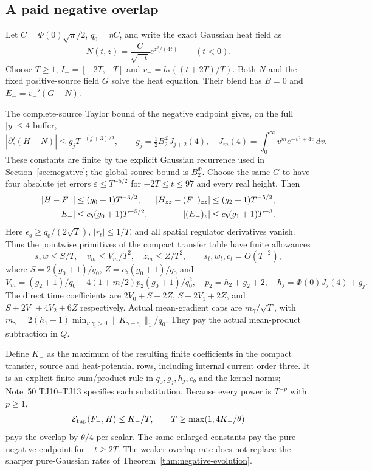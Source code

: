 \subsection{A paid negative overlap}
Let $C=\Phi(0)\sqrt\pi/2$, $q_0=\eta C$, and write the exact
Gaussian heat field as
\begin{equation}
 N(t,z)=\frac C{\sqrt{-t}}e^{z^2/(4t)}\qquad(t<0).
 \label{eq:tc-negative-model}
\end{equation}
Choose $T\ge1$, $I_-=[-2T,-T]$ and
$v_-=b_*((t+2T)/T)$. Both $N$ and the fixed positive-source field
$G$ solve the heat equation. Their blend has $B=0$ and
$E_-=v_-'(G-N)$.

The complete-source Taylor bound of the negative endpoint gives, on
the full $|y|\le4$ buffer,
\[
 |\partial_z^j(H-N)|\le g_jT^{-(j+3)/2},\qquad
 g_j=\tfrac12 B_2^\Phi J_{j+2}(4),\quad
 J_m(4)=\int_0^\infty v^m e^{-v^2+4v}\,dv.
\]
These constants are finite by the explicit Gaussian recurrence used in
Section~\ref{sec:negative}; the global source bound is $B_2^\Phi$.
Choose the same $G$ to have four absolute jet errors
$\varepsilon\le T^{-5/2}$ for $-2T\le t\le97$ and every real height.
Then
\begin{align}
 |H-F_-|&\le(g_0+1)T^{-3/2},&
 |H_{zz}-(F_-)_{zz}|&\le(g_2+1)T^{-5/2},\notag\\
 |E_-|&\le c_b(g_0+1)T^{-5/2},&
 |(E_-)_z|&\le c_b(g_1+1)T^{-3}.
 \label{eq:tc-negative-jets}
\end{align}
Here $\epsilon_g\ge q_0/(2\sqrt T)$, $|r_t|\le1/T$, and all
spatial regulator derivatives vanish. Thus the pointwise primitives of
the compact transfer table have finite allowances
\begin{equation}
 s,w\le S/T,\quad v_m\le V_m/T^2,\quad z_m\le Z/T^2,
 \qquad s_t,w_t,c_t=O(T^{-2}),
 \label{eq:tc-negative-primitives}
\end{equation}
where $S=2(g_0+1)/q_0$, $Z=c_b(g_0+1)/q_0$ and
\[
 V_m=(g_2+1)/q_0+4(1+m/2)p_2(g_0+1)/q_0^2,
 \quad p_2=h_2+g_2+2,\quad h_j=\Phi(0)J_j(4)+g_j.
\]
The direct time coefficients are $2V_0+S+2Z$,
$S+2V_1+2Z$, and $S+2V_1+4V_2+6Z$ respectively.
Actual mean-gradient caps are $m_\gamma/\sqrt T$, with
$m_\gamma=2(h_1+1)\min_{i:\gamma_i>0}\|K_{\gamma-e_i}\|_1/q_0$.
They pay the actual mean-product subtraction in $Q$.

Define $K_-$ as the maximum of the resulting finite coefficients in
the compact transfer, source and heat-potential rows, including internal
current order three. It is an explicit finite sum/product rule in
$q_0,g_j,h_j,c_b$ and the kernel norms; Note~50 TJ10--TJ13 specifies
each substitution. Because every power is $T^{-p}$ with $p\ge1$,
\begin{equation}
 \mathcal E_{\rm tup}(F_-,H)\le K_-/T,\qquad
 T\ge\max(1,4K_-/\theta)
 \label{eq:tc-negative-budget}
\end{equation}
pays the overlap by $\theta/4$ per scalar. The same enlarged constants
pay the pure negative endpoint for $-t\ge2T$.
The weaker overlap rate does not replace the sharper pure-Gaussian
rates of Theorem~\ref{thm:negative-evolution}.

